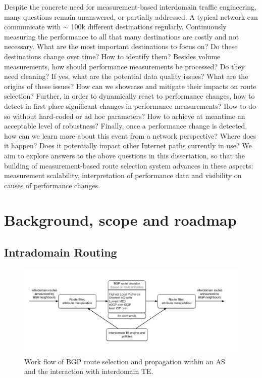 Despite the concrete need for measurement-based interdomain traffic engineering, many questions remain unanswered, or partially addressed.
A typical network can communicate with $\sim$ 100k different destinations regularly. 
Continuously measuring the performance to all that many destinations are costly and not necessary. 
What are the most important destinations to focus on? Do these destinations change over time? How to identify them?
Besides volume measurements, how should performance measurements be processed? Do they need cleaning?
If yes, what are the potential data quality issues? What are the origins of these issues? How can we showcase and mitigate their impacts on route selection?
Further, in order to dynamically react to performance changes, how to detect in first place significant changes in performance measurements? How to do so without hard-coded or ad hoc parameters? How to achieve at meantime an acceptable level of robustness?
Finally, once a performance change is detected, how can we learn more about this event from a network perspective? Where does it happen? Does it potentially impact other Internet paths currently in use? 
We aim to explore answers to the above questions in this dissertation, so that the building of measurement-based route selection system advances in these aspects: measurement scalability, interpretation of performance data and visibility on causes of performance changes. 

\chapter{Background, scope and roadmap}
\section{Intradomain Routing}
\begin{figure}[!htb]
\centering
\includegraphics[width=1.3\textwidth]{gfx/chap1/bgp_decision.pdf}
\caption{Work flow of \acf{BGP} route selection and propagation within an \acf{AS} and the interaction with interdomain \acf{TE}.}
\label{fig:bgp_decision}
\end{figure}

